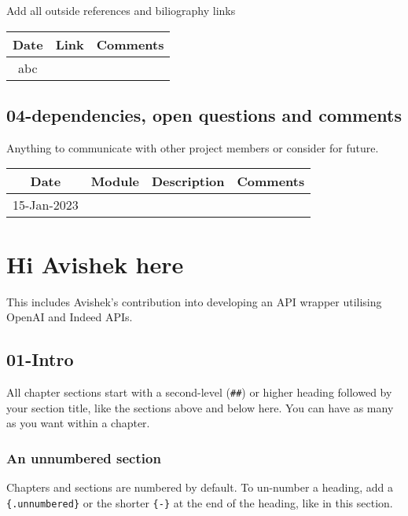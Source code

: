 \documentclass[
]{book}
\begin{document}
Add all outside references and biliography links

\begin{longtable}[]{@{}cll@{}}
\toprule()
Date & Link & Comments \\
\midrule()
\endhead
abc & & \\
\bottomrule()
\end{longtable}

\hypertarget{dependencies-open-questions-and-comments}{%
\section{04-dependencies, open questions and comments}\label{dependencies-open-questions-and-comments}}

Anything to communicate with other project members or consider for future.

\begin{longtable}[]{@{}clll@{}}
\toprule()
Date & Module & Description & Comments \\
\midrule()
\endhead
15-Jan-2023 & & & \\
\bottomrule()
\end{longtable}

\hypertarget{hi-avishek-here}{%
\chapter{Hi Avishek here}\label{hi-avishek-here}}

This includes Avishek's contribution into developing an API wrapper utilising OpenAI and Indeed APIs.

\hypertarget{intro-1}{%
\section{01-Intro}\label{intro-1}}

All chapter sections start with a second-level (\texttt{\#\#}) or higher heading followed by your section title, like the sections above and below here. You can have as many as you want within a chapter.

\hypertarget{an-unnumbered-section-2}{%
\subsection*{An unnumbered section}\label{an-unnumbered-section-2}}

Chapters and sections are numbered by default. To un-number a heading, add a \texttt{\{.unnumbered\}} or the shorter \texttt{\{-\}} at the end of the heading, like in this section.
\end{document}
